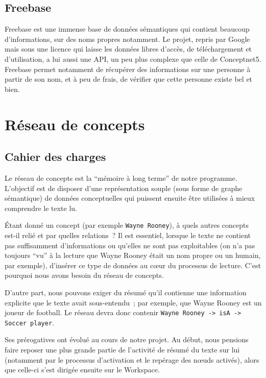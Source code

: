 \documentclass[a4paper, 12pt]{article}
\begin{document}
\subsection{Freebase}\label{Subsection:Freebase}

Freebase est une immense base de données sémantiques qui contient beaucoup d'informations, sur des noms propres notamment. Le projet, repris par Google mais sous une licence qui laisse les données libres d'accès, de téléchargement et d'utilisation, a lui aussi une API, un peu plus complexe que celle de Conceptnet5. Freebase permet notamment de récupérer des informations sur une personne à partir de son nom, et à peu de frais, de vérifier que cette personne existe bel et bien.


\section{Réseau de concepts}\label{Section:RC}


\subsection{Cahier des charges}

Le réseau de concepts est la ``mémoire à long terme'' de notre programme. L'objectif est de disposer d'une représentation souple (sous forme de graphe sémantique) de données conceptuelles qui puissent ensuite être utilisées à mieux comprendre le texte lu.

Étant donné un concept (par exemple \verb|Wayne Rooney|), à quels autres concepts est-il relié et par quelles relations~? Il est essentiel, lorsque le texte ne contient pas suffisamment d'informations ou qu'elles ne sont pas exploitables (on n'a pas toujours ``vu'' à la lecture que Wayne Rooney était un nom propre ou un humain, par exemple), d'insérer ce type de données au cœur du processus de lecture. C'est pourquoi nous avons besoin du réseau de concepts.

D'autre part, nous pouvons exiger du résumé qu'il contienne une information explicite que le texte avait sous-entendu~; par exemple, que Wayne Rooney est un joueur de football. Le réseau devra donc contenir \verb|Wayne Rooney -> isA -> Soccer player|.

Ses prérogatives ont évolué au cours de notre projet. Au début, nous pensions faire reposer une plus grande partie de l'activité de résumé du texte sur lui (notamment par le processus d'activation et le repérage des nœuds activés), alors que celle-ci s'est dirigée ensuite sur le Workspace.
\end{document}
